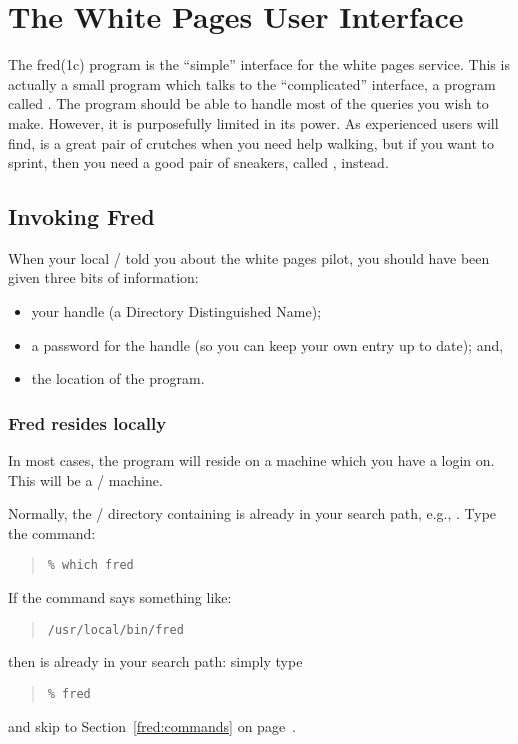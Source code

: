 
\chapter	{The White Pages User Interface}
The \man fred(1c) program is the ``simple'' interface for the white pages
service.
This is actually a small program which talks to the ``complicated'' interface,
a program called .
The  program should be able to handle most of the queries you wish
to make.
However,
it is purposefully limited in its power.
As experienced users will find,
 is a great pair of crutches when you need help walking,
but if you want to sprint, then you need a good pair of sneakers,
called ,
instead.

\section	{Invoking Fred}
When your local \camayoc/ told you about the white pages pilot,
you should have been given three bits of information:
\begin{itemize}
\item	your handle (a Directory Distinguished Name);

\item	a password for the handle (so you can keep your own entry up to date);
	and,

\item	the location of the  program.
\end{itemize}

\subsection	{Fred resides locally}
In most cases,
the  program will reside on a machine which you have a login on.
This will be a \unix/ machine.

Normally,
the \unix/ directory containing  is already in your search path,
e.g., .
Type the command:
\begin{quote}\small\begin{verbatim}
% which fred
\end{verbatim}\end{quote}
If the  command says something like:
\begin{quote}\small\begin{verbatim}
/usr/local/bin/fred
\end{verbatim}\end{quote}
then  is already in your search path:
simply type
\begin{quote}\small\begin{verbatim}
% fred
\end{verbatim}\end{quote}
and skip to Section~\ref{fred:commands} on page~\pageref{fred:commands}.

